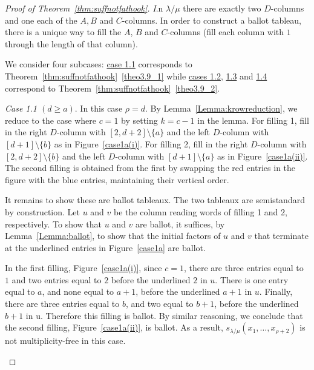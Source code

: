 \documentclass[10pt]{article}
\theoremstyle{definition}
\let\hypertargeta\hypertarget %
\let\hyperlinka\hyperlink %
\newenvironment{Case}[1]{\par\vskip2pt\noindent%
\emph{#1}.}{\vskip2pt}
\begin{document}
\begin{proof}[Proof of Theorem~\ref{thm:suffnotfathook}]
\begin{Case}
In $\lambda / \mu$ there are exactly two $D$-columns and one each of the $A,B$ and $C$-columns. In order to construct a ballot tableau, there is a unique way to fill the $A$, $B$ and $C$-columns (fill each column with $1$ through the length of that column). 

We consider four subcases: \hyperlinka{Case 1.1}{case 1.1} corresponds to Theorem~\ref{thm:suffnotfathook}~\ref{theo3.9_1} while \hyperlinka{Case 1.2}{cases 1.2}, \hyperlinka{Case 1.3}{1.3} and \hyperlinka{Case 1.4}{1.4} correspond to Theorem~\ref{thm:suffnotfathook}~\ref{theo3.9_2}. 
\end{Case}

\begin{Case}
{\hypertargeta{Case 1.1}{Case 1.1} $(d\geq a)$} 
In this case $\rho = d$. By Lemma~\ref{Lemma:krowreduction}, we reduce to the case where $c=1$ by setting $k = c-1$ in the lemma. For filling 1, fill in the right $D$-column with $[2,d+2]\setminus\{a\}$ and the left $D$-column with $[d+1]\setminus \{b\}$ as in Figure~\ref{case1a(i)}. For filling 2, fill in the right $D$-column with $[2,d+2]\setminus \{b\}$ and the left $D$-column with $[d+1]\setminus \{a\}$ as in Figure~\ref{case1a(ii)}. The second filling is obtained from the first by swapping the red entries in the figure with the blue entries, maintaining their vertical order.

It remains to show these are ballot tableaux. The two tableaux are semistandard by construction. Let $u$ and $v$ be the column reading words of filling 1 and 2, respectively. To show that $u$ and $v$ are ballot, it suffices, by Lemma~\ref{Lemma:ballot}, to show that the initial factors of $u$ and $v$ that terminate at the underlined entries in Figure~\ref{case1a} are ballot.

In the first filling, Figure~\ref{case1a(i)}, since $c=1$, there are three entries equal to $1$ and two entries equal to $2$ before the underlined $2$ in $u$. There is one entry equal to $a$, and none equal to $a+1$, before the underlined $a+1$ in $u$. Finally, there are three entries equal to $b$, and two equal to $b+1$, before the underlined $b+1$ in u. Therefore this filling is ballot. By similar reasoning, we conclude that the second filling, Figure~\ref{case1a(ii)}, is ballot. As a result, $s_{\lambda/\mu}(x_1,\ldots,x_{\rho+2})$ is not multiplicity-free in this case.


\begin{figure}[htb]\centering
 \begin{subfigure}{0.45\textwidth}
\end{subfigure}
\end{figure}
\end{Case}
\end{proof}
\end{document}
